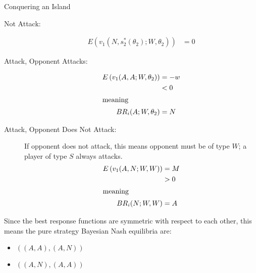 \documentclass[8pt]{extarticle}
\begin{document}
\begin{problem}{Conquering an Island}
\begin{description}
        \begin{description}
          \item[Not Attack:]
            \begin{align*}
              E\left(v_1(N,s_2^{\ast}(\theta_2);W,\theta_2)\right) &= 0
            \end{align*}
          \item[Attack, Opponent Attacks:]
            \begin{align*}
              E\left(v_1(A,A;W,\theta_2)\right) &= -w\\
                                                &< 0\\
                                                \shortintertext{meaning}
              BR_i(A;W,\theta_2) &= N
            \end{align*}
          \item[Attack, Opponent Does Not Attack:]
            If opponent does not attack, this means opponent must be of type $W$; a player of type $S$ always attacks.
            \begin{align*}
              E\left(v_1(A,N;W,W)\right) &= M\\
                                         &> 0\\
                                         \shortintertext{meaning}
              BR_i(N; W,W) &= A
            \end{align*}
        \end{description}
    \end{description}
    Since the best response functions are symmetric with respect to each other, this means the pure strategy Bayesian Nash equilibria are:
    \begin{itemize}
      \item $((A,A),(A,N))$
      \item $((A,N),(A,A))$
    \end{itemize}
  \end{problem}
\end{document}
